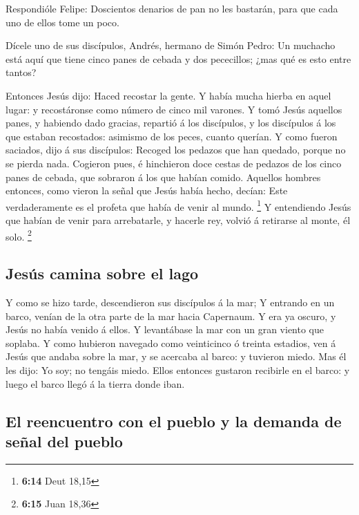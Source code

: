  Respondióle Felipe: Doscientos denarios de pan no les
bastarán, para que cada uno de ellos tome un poco.

 Dícele uno de sus discípulos, Andrés, hermano de Simón
Pedro:  Un muchacho está aquí que tiene cinco panes de
cebada y dos pececillos; ¿mas qué es esto entre tantos?

 Entonces Jesús dijo: Haced recostar la gente. Y había
mucha hierba en aquel lugar: y recostáronse como número de cinco mil
varones.  Y tomó Jesús aquellos panes, y habiendo dado
gracias, repartió á los discípulos, y los discípulos á los que estaban
recostados: asimismo de los peces, cuanto querían.  Y
como fueron saciados, dijo á sus discípulos: Recoged los pedazos que han
quedado, porque no se pierda nada.  Cogieron pues, é
hinchieron doce cestas de pedazos de los cinco panes de cebada, que
sobraron á los que habían comido.  Aquellos hombres
entonces, como vieron la señal que Jesús había hecho, decían: Este
verdaderamente es el profeta que había de venir al mundo. \footnote{\textbf{6:14}
  Deut 18,15}  Y entendiendo Jesús que habían de venir
para arrebatarle, y hacerle rey, volvió á retirarse al monte, él solo.
\footnote{\textbf{6:15} Juan 18,36}

\hypertarget{jesuxfas-camina-sobre-el-lago}{%
\subsection{Jesús camina sobre el
lago}\label{jesuxfas-camina-sobre-el-lago}}

 Y como se hizo tarde, descendieron sus discípulos á la
mar;  Y entrando en un barco, venían de la otra parte de
la mar hacia Capernaum. Y era ya oscuro, y Jesús no había venido á
ellos.  Y levantábase la mar con un gran viento que
soplaba.  Y como hubieron navegado como veinticinco ó
treinta estadios, ven á Jesús que andaba sobre la mar, y se acercaba al
barco: y tuvieron miedo.  Mas él les dijo: Yo soy; no
tengáis miedo.  Ellos entonces gustaron recibirle en el
barco: y luego el barco llegó á la tierra donde iban.

\hypertarget{el-reencuentro-con-el-pueblo-y-la-demanda-de-seuxf1al-del-pueblo}{%
\subsection{El reencuentro con el pueblo y la demanda de señal del
pueblo}\label{el-reencuentro-con-el-pueblo-y-la-demanda-de-seuxf1al-del-pueblo}}

